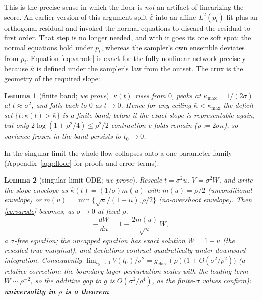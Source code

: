 \documentclass[11pt]{article}
\newtheorem{lemma}{Lemma}
\theoremstyle{remark}
\newcommand{\kb}{\bar\kappa}
\newcommand{\epshat}{\hat\varepsilon}
\newcommand{\sigsq}{\sigma^2}
\begin{document}
This is the precise sense in which the floor is \emph{not} an artifact of linearizing the
score. An earlier version of this argument split $\epshat$ into an affine $L^2(p_t)$ fit
plus an orthogonal residual and invoked the normal equations to discard the residual to
first order. That step is no longer needed, and with it goes its one soft spot: the normal
equations hold under $p_t$, whereas the sampler's own ensemble deviates from $p_t$.
Equation \eqref{eq:varode} is exact for the fully nonlinear network precisely because
$\hat\kappa$ is defined under the sampler's law from the outset. The crux is the geometry
of the required slope:

\begin{lemma}[finite band; \emph{we prove}]\label{lem:band}
$\kappa(t)$ rises from $0$, peaks at $\kappa_{\max}=1/(2\sigma)$ at $t\approx\sigsq$,
and falls back to $0$ as $t\to0$. Hence for any ceiling $\kb<\kappa_{\max}$ the deficit
set $\{t:\kappa(t)>\kb\}$ is a finite band; below it the exact slope is representable
again, but only $2\log(1+\rho^2/4)\le\rho^2/2$ contraction e-folds remain
($\rho:=2\sigma\kb$), so variance frozen in the band persists to $t_0\to0$.
\end{lemma}

In the singular limit the whole flow collapses onto a one-parameter family
(Appendix~\ref{app:floor} for proofs and error terms):

\begin{lemma}[singular-limit ODE; \emph{we prove}]\label{lem:limitode}
Rescale $t=\sigsq u$, $V=\sigsq W$, and write the slope envelope as
$\hat\kappa(t)=(1/\sigma)m(u)$ with $m(u)=\rho/2$ (unconditional envelope) or
$m(u)=\min\{\sqrt u/(1+u),\rho/2\}$ (no-overshoot envelope). Then \eqref{eq:varode}
becomes, as $\sigma\to0$ at fixed $\rho$,
\begin{equation}
-\frac{dW}{du}=1-\frac{2m(u)}{\sqrt u}\,W ,
\label{eq:limitode}
\end{equation}
a $\sigma$-free equation; the uncapped equation has exact solution $W=1+u$
(the rescaled true marginal), and deviations contract quadratically under downward
integration. Consequently
$\lim_{t_0\to0}V(t_0)/\sigsq=g_{\mathrm{class}}(\rho)\big(1+O(\sigsq/\rho^2)\big)$
(a \emph{relative} correction: the boundary-layer perturbation scales with the leading
term $W\sim\rho^{-2}$, so the additive gap to $g$ is $O(\sigsq/\rho^4)$, as the
finite-$\sigma$ values confirm):
\textbf{universality in $\rho$ is a theorem}.
\end{lemma}
\end{document}
